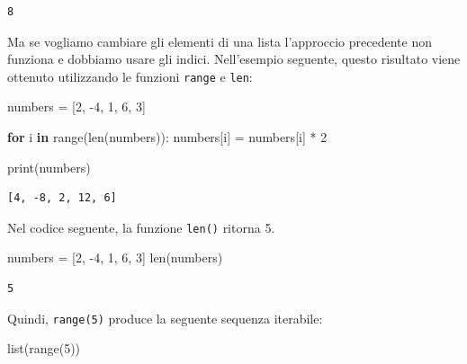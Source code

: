 \documentclass[
  letterpaper,
  krantz2]{{[}./krantz{]}}
\newenvironment{Shaded}{\begin{snugshade}}{\end{snugshade}}
\newcommand{\BuiltInTok}[1]{\textcolor[rgb]{0.00,0.23,0.31}{#1}}
\newcommand{\ControlFlowTok}[1]{\textcolor[rgb]{0.00,0.23,0.31}{\textbf{#1}}}
\newcommand{\DecValTok}[1]{\textcolor[rgb]{0.68,0.00,0.00}{#1}}
\newcommand{\KeywordTok}[1]{\textcolor[rgb]{0.00,0.23,0.31}{\textbf{#1}}}
\newcommand{\NormalTok}[1]{\textcolor[rgb]{0.00,0.23,0.31}{#1}}
\newcommand{\OperatorTok}[1]{\textcolor[rgb]{0.37,0.37,0.37}{#1}}
\begin{document}
\begin{verbatim}
8
\end{verbatim}

Ma se vogliamo cambiare gli elementi di una lista l'approccio precedente
non funziona e dobbiamo usare gli indici. Nell'esempio seguente, questo
risultato viene ottenuto utilizzando le funzioni \texttt{range} e
\texttt{len}:

\begin{Shaded}
\begin{Highlighting}[]
\NormalTok{numbers }\OperatorTok{=}\NormalTok{ [}\DecValTok{2}\NormalTok{, }\OperatorTok{{-}}\DecValTok{4}\NormalTok{, }\DecValTok{1}\NormalTok{, }\DecValTok{6}\NormalTok{, }\DecValTok{3}\NormalTok{]}

\ControlFlowTok{for}\NormalTok{ i }\KeywordTok{in} \BuiltInTok{range}\NormalTok{(}\BuiltInTok{len}\NormalTok{(numbers)):}
\NormalTok{    numbers[i] }\OperatorTok{=}\NormalTok{ numbers[i] }\OperatorTok{*} \DecValTok{2}

\BuiltInTok{print}\NormalTok{(numbers)}
\end{Highlighting}
\end{Shaded}

\begin{verbatim}
[4, -8, 2, 12, 6]
\end{verbatim}

Nel codice seguente, la funzione \texttt{len()} ritorna 5.

\begin{Shaded}
\begin{Highlighting}[]
\NormalTok{numbers }\OperatorTok{=}\NormalTok{ [}\DecValTok{2}\NormalTok{, }\OperatorTok{{-}}\DecValTok{4}\NormalTok{, }\DecValTok{1}\NormalTok{, }\DecValTok{6}\NormalTok{, }\DecValTok{3}\NormalTok{]}
\BuiltInTok{len}\NormalTok{(numbers)}
\end{Highlighting}
\end{Shaded}

\begin{verbatim}
5
\end{verbatim}

Quindi, \texttt{range(5)} produce la seguente sequenza iterabile:

\begin{Shaded}
\begin{Highlighting}[]
\BuiltInTok{list}\NormalTok{(}\BuiltInTok{range}\NormalTok{(}\DecValTok{5}\NormalTok{))}
\end{Highlighting}
\end{Shaded}
\end{document}
